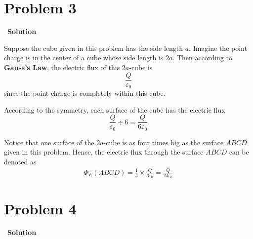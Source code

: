 \documentclass[12pt,a4paper]{article}
\begin{document}
\section*{\large \textbf{Problem 3}}~{\textbf{Solution}}

Suppose the cube given in this problem has the side length $a$. Imagine the point charge is in the center of a cube whose side length is $2a$. Then according to \textbf{Gauss's Law}, the electric flux of this $2a$-cube is
$$
    \frac{Q}{\varepsilon_0}
$$
since the point charge is completely within this cube.

According to the symmetry, each surface of the cube has the electric flux
$$
    \frac{Q}{\varepsilon_0} \div 6 = \frac{Q}{6\varepsilon_0}
$$

Notice that one surface of the $2a$-cube is as four times big as the surface $ABCD$ given in this problem. Hence, the electric flux through the surface $ABCD$ can be denoted as
\begin{align}
    \Phi_E(ABCD) = \frac{1}{4} \times \frac{Q}{6\varepsilon_0} = \frac{Q}{24\varepsilon_0}
\end{align}

\section*{\large \textbf{Problem 4}}~{\textbf{Solution}}
\end{document}
